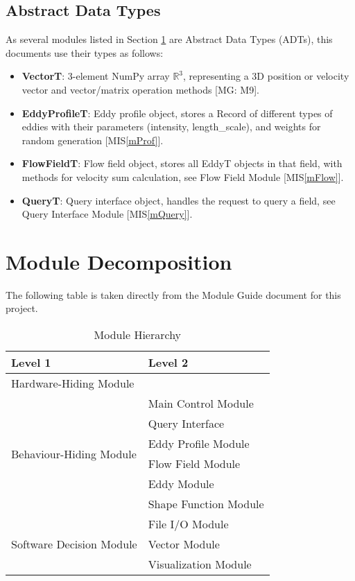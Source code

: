 \documentclass[12pt, titlepage]{article}
\begin{document}
\subsection{Abstract Data Types}

As several modules listed in Section \ref{SecMD} are Abstract Data Types (ADTs), this documents use their types as follows:
\begin{itemize}
  \item \textbf{VectorT}: 3-element NumPy array $\mathbb{R}^3$, representing a 3D position or velocity vector and vector/matrix operation methods [MG: M9].
  \item \textbf{EddyProfileT}: Eddy profile object, stores a Record of different types of eddies with their parameters (intensity, length\_scale), and weights for random generation [MIS\ref{mProf}].
  \item \textbf{FlowFieldT}: Flow field object, stores all EddyT objects in that field, with methods for velocity sum calculation, see Flow Field Module [MIS\ref{mFlow}].
  \item \textbf{QueryT}: Query interface object, handles the request to query a field, see Query Interface Module [MIS\ref{mQuery}].
\end{itemize}

\section{Module Decomposition} \label{SecMD}

The following table is taken directly from the Module Guide document for this project.
\begin{table}[h!]
  \centering
  \begin{tabular}{p{} p{}}
  \toprule
  \textbf{Level 1} & \textbf{Level 2}\\
  \midrule
  
  {Hardware-Hiding Module} & ~ \\
  \midrule
  
  \multirow{6}{0.3\textwidth}{Behaviour-Hiding Module}
  & Main Control Module\\
  & Query Interface\\
  & Eddy Profile Module\\
  & Flow Field Module\\
  & Eddy Module\\
  & Shape Function Module\\
  \midrule
  
  \multirow{3}{0.3\textwidth}{Software Decision Module} 
  & File I/O Module\\
  & Vector Module\\
  & Visualization Module\\
  \bottomrule

\end{tabular}
\caption{Module Hierarchy}
\label{TblMH}
\end{table}
\end{document}
